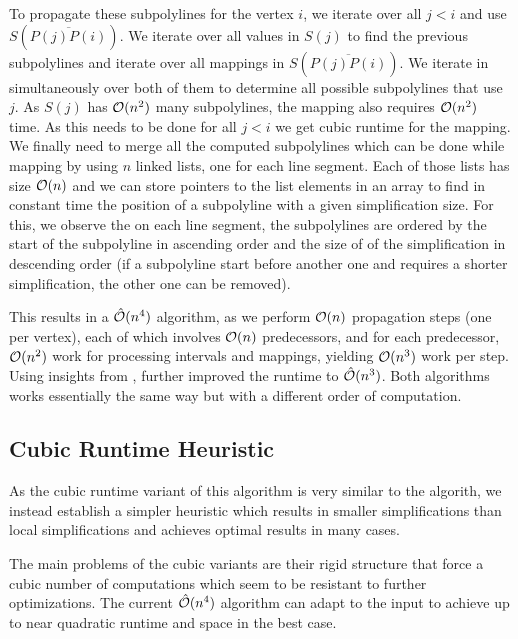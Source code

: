 To propagate these subpolylines for the vertex \(i\), we iterate over all \(j < i\) and use \(S(\overline{P(j)P(i)})\). We iterate over all values in \(S(j)\) to find the previous subpolylines and iterate over all mappings in \(S(\overline{P(j)P(i)})\). We iterate in simultaneously over both of them to determine all possible subpolylines that use \(j\). As \(S(j)\) has \(\mathcal{O}(n^2)\) many subpolylines, the mapping also requires \(\mathcal{O}(n^2)\) time. As this needs to be done for all \(j < i\) we get cubic runtime for the mapping. We finally need to merge all the computed subpolylines which can be done while mapping by using \(n\) linked lists, one for each line segment. Each of those lists has size \(\mathcal{O}(n)\) and we can store pointers to the list elements in an array to find in constant time the position of a subpolyline with a given simplification size. For this, we observe the on each line segment, the subpolylines are ordered by the start of the subpolyline in ascending order and the size of of the simplification in descending order (if a subpolyline start before another one and requires a shorter simplification, the other one can be removed).

This results in a \(\hat{\mathcal{O}}(n^4)\) algorithm, as we perform \(\mathcal{O}(n)\) propagation steps (one per vertex), each of which involves \(\mathcal{O}(n)\) predecessors, and for each predecessor, \(\mathcal{O}(n^2)\) work for processing intervals and mappings, yielding \(\mathcal{O}(n^3)\) work per step. Using insights from \citeauthor{polyline_simplification_has_cubic_complexity_bringmannetal}, \citeauthor{global_curve_simplification} further improved the runtime to \(\hat{\mathcal{O}}(n^3)\). Both algorithms works essentially the same way but with a different order of computation.

\subsection{Cubic Runtime Heuristic}
As the cubic runtime variant of this algorithm is very similar to the \citeauthor{polyline_simplification_has_cubic_complexity_bringmannetal} algorith, we instead establish a simpler heuristic which results in smaller simplifications than local simplifications and achieves optimal results in many cases.

The main problems of the cubic variants are their rigid structure that force a cubic number of computations which seem to be resistant to further optimizations. The current \(\hat{\mathcal{O}}(n^4)\) algorithm can adapt to the input to achieve up to near quadratic runtime and space in the best case.

